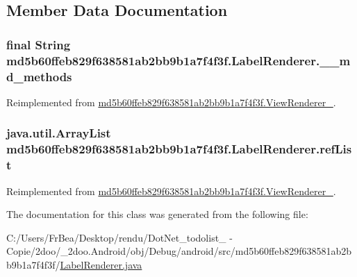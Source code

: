 \subsection{Member Data Documentation}
\hypertarget{classmd5b60ffeb829f638581ab2bb9b1a7f4f3f_1_1_label_renderer_6d75a8c95caaa11a9bbc9581bb0151b3}{
\subsubsection[{\_\-\_\-md\_\-methods}]{\setlength{\rightskip}{0pt plus 5cm}final String {\bf md5b60ffeb829f638581ab2bb9b1a7f4f3f.LabelRenderer.\_\-\_\-md\_\-methods}}}
\label{classmd5b60ffeb829f638581ab2bb9b1a7f4f3f_1_1_label_renderer_6d75a8c95caaa11a9bbc9581bb0151b3}




Reimplemented from \hyperlink{classmd5b60ffeb829f638581ab2bb9b1a7f4f3f_1_1_view_renderer__2_80b609e3e4054c380887d4dc2907a875}{md5b60ffeb829f638581ab2bb9b1a7f4f3f.ViewRenderer\_}.\hypertarget{classmd5b60ffeb829f638581ab2bb9b1a7f4f3f_1_1_label_renderer_ff060607c57202cbc808598219736919}{
\subsubsection[{refList}]{\setlength{\rightskip}{0pt plus 5cm}java.util.ArrayList {\bf md5b60ffeb829f638581ab2bb9b1a7f4f3f.LabelRenderer.refList}}}
\label{classmd5b60ffeb829f638581ab2bb9b1a7f4f3f_1_1_label_renderer_ff060607c57202cbc808598219736919}




Reimplemented from \hyperlink{classmd5b60ffeb829f638581ab2bb9b1a7f4f3f_1_1_view_renderer__2_6c151401977148a92c515e9c7de1aaf8}{md5b60ffeb829f638581ab2bb9b1a7f4f3f.ViewRenderer\_}.

The documentation for this class was generated from the following file:\begin{CompactItemize}
\item 
C:/Users/FrBea/Desktop/rendu/DotNet\_\-todolist\_ - Copie/2doo/\_\-2doo.Android/obj/Debug/android/src/md5b60ffeb829f638581ab2bb9b1a7f4f3f/\hyperlink{md5b60ffeb829f638581ab2bb9b1a7f4f3f_2_label_renderer_8java}{LabelRenderer.java}\end{CompactItemize}

